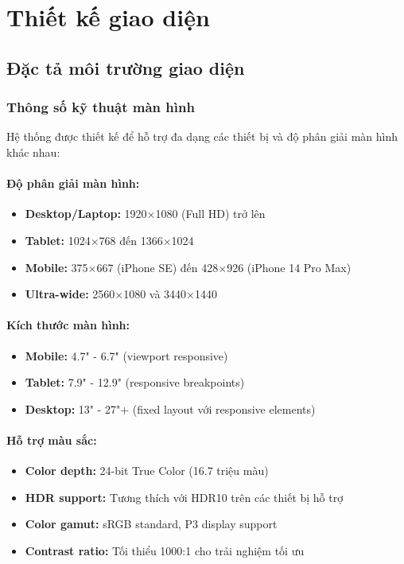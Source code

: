 \section{Thiết kế giao diện}

\subsection{Đặc tả môi trường giao diện}

\subsubsection{Thông số kỹ thuật màn hình}

Hệ thống được thiết kế để hỗ trợ đa dạng các thiết bị và độ phân giải màn hình khác nhau:

\paragraph{Độ phân giải màn hình:}
\begin{itemize}
    \item \textbf{Desktop/Laptop:} 1920×1080 (Full HD) trở lên
    \item \textbf{Tablet:} 1024×768 đến 1366×1024
    \item \textbf{Mobile:} 375×667 (iPhone SE) đến 428×926 (iPhone 14 Pro Max)
    \item \textbf{Ultra-wide:} 2560×1080 và 3440×1440
\end{itemize}

\paragraph{Kích thước màn hình:}
\begin{itemize}
    \item \textbf{Mobile:} 4.7" - 6.7" (viewport responsive)
    \item \textbf{Tablet:} 7.9" - 12.9" (responsive breakpoints)
    \item \textbf{Desktop:} 13" - 27"+ (fixed layout với responsive elements)
\end{itemize}

\paragraph{Hỗ trợ màu sắc:}
\begin{itemize}
    \item \textbf{Color depth:} 24-bit True Color (16.7 triệu màu)
    \item \textbf{HDR support:} Tương thích với HDR10 trên các thiết bị hỗ trợ
    \item \textbf{Color gamut:} sRGB standard, P3 display support
    \item \textbf{Contrast ratio:} Tối thiểu 1000:1 cho trải nghiệm tối ưu
\end{itemize}

